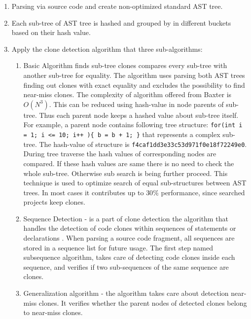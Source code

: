 \documentclass{report}
\begin{document}
\begin{enumerate}
	\item Parsing via source code and create non-optimized standard AST tree.
	\item Each sub-tree of AST tree is hashed and grouped by in different buckets based on their hash value. 
	\item Apply the clone detection algorithm that three sub-algorithms:
		\begin{enumerate}[label*=\arabic*.]
		\item Basic Algorithm finds sub-tree clones compares every sub-tree with another sub-tree for equality. The algorithm uses parsing both AST trees finding out clones with exact equality and excludes the possibility to find near-miss clones. The complexity of algorithm offered from Baxter \cite{baxter} is 
$ O(N^3)$. This can be reduced using hash-value in node parents of sub-tree. Thus each parent node keeps a hashed value about sub-tree itself. For example, a parent node contains following tree structure: \texttt{for(int i = 1; i <= 10; i++ )\{ b = b + 1; \}} that represents a complex sub-tree. The hash-value of structure is \texttt{f4caf1dd3e33c53d971f0e18f72249e0}. During tree traverse the hash values of corresponding nodes are compared. If these hash values are same there is no need to check the whole sub-tree. Otherwise sub search is being further proceed. This technique is used to optimize search of equal sub-structures between AST trees. In most cases it contributes up to $30\%$ performance, since searched projects keep clones.
		\item Sequence Detection - is a part of clone detection the algorithm that handles the detection of code clones within sequences of statements or declarations \cite{flavius}. When parsing a source code fragment, all sequences are stored in a sequence list for future usage. The first step named subsequence algorithm, takes care of detecting code clones inside each sequence, and verifies if two sub-sequences of the same sequence are clones.	
		\item Generalization algorithm - the algorithm takes care about detection near-miss clones. It verifies whether the parent nodes of detected clones belong to near-miss clones.
		 \end{enumerate} 
\end{enumerate}
\end{document}
